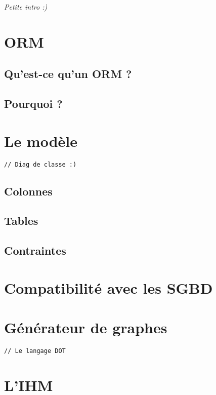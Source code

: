 \textit{Petite intro :)}

\section{ORM}
\subsection{Qu'est-ce qu'un ORM ?}
\subsection{Pourquoi ?}

\section{Le modèle}
\verb+// Diag de classe :)+
\subsection{Colonnes}
\subsection{Tables}
\subsection{Contraintes}

\section{Compatibilité avec les SGBD}

\section{Générateur de graphes}
\verb+// Le langage DOT+

\section{L'IHM}